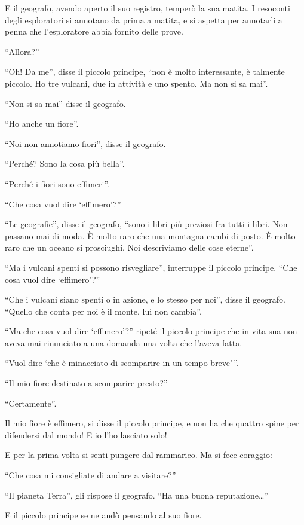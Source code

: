 \documentclass[11pt]{scrbook}
\begin{document}
E il geografo, avendo aperto il suo registro, temperò la sua matita. I resoconti degli esploratori si annotano da prima a matita, e si aspetta per annotarli a penna che l'esploratore abbia fornito delle prove.

``Allora?''

``Oh! Da me'', disse il piccolo principe, ``non è molto interessante, è talmente piccolo. Ho tre vulcani, due in attività e uno spento. Ma non si sa mai''.

``Non si sa mai'' disse il geografo.

``Ho anche un fiore''.

``Noi non annotiamo fiori'', disse il geografo.

``Perché? Sono la cosa più bella''.

``Perché i fiori sono effimeri''.

``Che cosa vuol dire `effimero'?''

``Le geografie'', disse il geografo, ``sono i libri più preziosi fra tutti i libri. Non passano mai di moda. È molto raro che una montagna cambi di posto. È molto raro che un oceano si prosciughi. Noi descriviamo delle cose eterne''.

``Ma i vulcani spenti si possono risvegliare'', interruppe il piccolo principe. ``Che cosa vuol dire `effimero'?''

``Che i vulcani siano spenti o in azione, e lo stesso per noi'', disse il geografo. ``Quello che conta per noi è il monte, lui non cambia''.

``Ma che cosa vuol dire `effimero'?'' ripeté il piccolo principe che in vita sua non aveva mai rinunciato a una domanda una volta che l'aveva fatta.

``Vuol dire `che è minacciato di scomparire in un tempo breve'\,''.

``Il mio fiore destinato a scomparire presto?''

``Certamente''.

Il mio fiore è effimero, si disse il piccolo principe, e non ha che quattro spine per difendersi dal mondo! E io l'ho lasciato solo!

E per la prima volta si senti pungere dal rammarico. Ma si fece coraggio:

``Che cosa mi consigliate di andare a visitare?''

``Il pianeta Terra'', gli rispose il geografo. ``Ha una buona reputazione\ldots{}''

E il piccolo principe se ne andò pensando al suo fiore.
\end{document}
